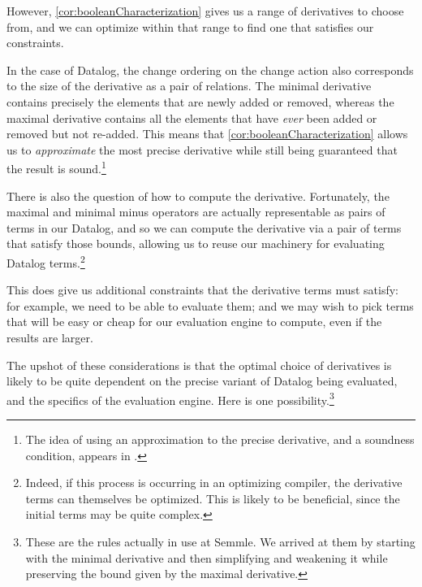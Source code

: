 However, \cref{cor:booleanCharacterization} gives us a range of derivatives to
choose from, and we can optimize within that range to find one that satisfies
our constraints.

In the case of Datalog, the change ordering on the change action also
corresponds to the size of the derivative as a pair of relations. The minimal
derivative contains precisely the elements that are newly added or removed,
whereas the maximal derivative contains all the elements that have \emph{ever}
been added or removed but not re-added. This means that \cref{cor:booleanCharacterization} allows
us to \emph{approximate} the most precise derivative while still being
guaranteed that the result is sound.\footnote{The idea of using an approximation
to the precise derivative, and a soundness condition, appears in \textcite{bancilhon1986amateur}.}

There is also the question of how to compute the derivative. Fortunately, the
maximal and minimal minus operators are actually representable as pairs of terms
in our Datalog, and so we can compute the derivative via a pair of terms that
satisfy those bounds, allowing us to reuse our machinery for evaluating Datalog
terms.\footnote{Indeed, if this process is occurring in an optimizing compiler,
  the derivative terms can themselves be optimized. This is likely to be
  beneficial, since the initial terms may be quite complex.}

This does give us additional constraints that the derivative terms must satisfy:
for example, we need to be able to evaluate them; and we may wish to pick terms that will be easy or cheap
for our evaluation engine to compute, even if the results are larger.

The upshot of these considerations is that the optimal choice of derivatives is likely
to be quite dependent on the precise variant of Datalog being evaluated, and the
specifics of the evaluation engine. Here is one possibility.\footnote{These are
  the rules actually in use at Semmle. We arrived at them by starting with the
  minimal derivative and then simplifying and weakening it while preserving the
  bound given by the maximal derivative.}

